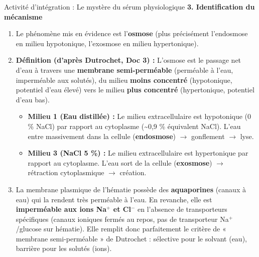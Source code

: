 \documentclass[11pt]{article}
\begin{document}
\begin{exoresolu}{Activité d'intégration : Le mystère du sérum physiologique}
\medskip
\noindent\textbf{3. Identification du mécanisme}
\begin{enumerate}
    \item Le phénomène mis en évidence est l'\textbf{osmose} (plus précisément l'endosmose en milieu hypotonique, l'exosmose en milieu hypertonique).
    \item \textbf{Définition (d'après Dutrochet, Doc 3) :} L'osmose est le passage net d'eau à travers une \textbf{membrane semi-perméable} (perméable à l'eau, imperméable aux solutés), du milieu \textbf{moins concentré} (hypotonique, potentiel d'eau élevé) vers le milieu \textbf{plus concentré} (hypertonique, potentiel d'eau bas).
    \begin{itemize}
        \item \textbf{Milieu 1 (Eau distillée) :} Le milieu extracellulaire est hypotonique (0 \% NaCl) par rapport au cytoplasme (\textasciitilde 0,9 \% équivalent NaCl). L'eau entre massivement dans la cellule (\textbf{endosmose}) $\rightarrow$ gonflement $\rightarrow$ lyse.
        \item \textbf{Milieu 3 (NaCl 5 \%) :} Le milieu extracellulaire est hypertonique par rapport au cytoplasme. L'eau sort de la cellule (\textbf{exosmose}) $\rightarrow$ rétraction cytoplasmique $\rightarrow$ création.
    \end{itemize}
    \item La membrane plasmique de l'hématie possède des \textbf{aquaporines} (canaux à eau) qui la rendent très perméable à l'eau. En revanche, elle est \textbf{imperméable aux ions Na$^+$ et Cl$^-$} en l'absence de transporteurs spécifiques (canaux ioniques fermés au repos, pas de transporteur Na$^+$/glucose sur hématie). Elle remplit donc parfaitement le critère de « membrane semi-perméable » de Dutrochet : sélective pour le solvant (eau), barrière pour les solutés (ions).
\end{enumerate}


\end{exoresolu}
\end{document}

